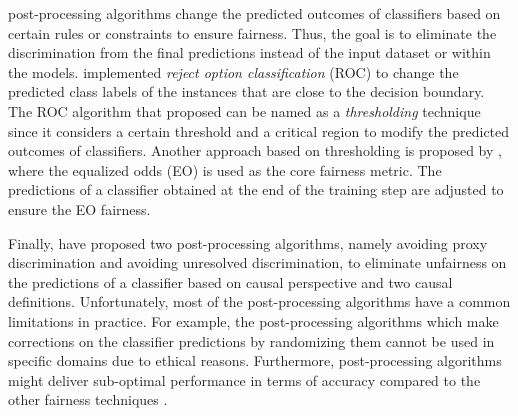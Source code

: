 post-processing algorithms change the predicted outcomes of classifiers based on certain rules or constraints to ensure fairness. Thus, the goal is to eliminate the discrimination from the final predictions instead of the input dataset or within the models. \citeauthor{kamiran2012ROC} \cite{kamiran2012ROC} implemented \emph{reject option classification} (ROC) to change the predicted class labels of the instances that are close to the decision boundary. 
The ROC algorithm that \citeauthor{kamiran2012ROC} proposed can be named as a \emph{thresholding} technique since it considers a certain threshold and a critical region to modify the predicted outcomes of classifiers.
Another approach based on thresholding is proposed by \citeauthor{hardt2016equal_odds_opport} \cite{hardt2016equal_odds_opport}, where the equalized odds (EO) is used as the core fairness metric. The predictions of a classifier obtained at the end of the training step are adjusted to ensure the EO fairness. 


Finally, \citeauthor{kilbertus2017avoiding_discr} \cite{kilbertus2017avoiding_discr} have proposed two post-processing algorithms, namely avoiding proxy discrimination and avoiding unresolved discrimination, to eliminate unfairness on the predictions of a classifier based on causal perspective and two causal definitions. 
Unfortunately, most of the post-processing algorithms have a common limitations in practice. For example, the post-processing algorithms which make corrections on the classifier predictions by randomizing them cannot be used in specific domains due to ethical reasons. Furthermore, post-processing algorithms might deliver sub-optimal performance in terms of accuracy compared to the other fairness techniques \cite{woodworth2017post-learning}. 



